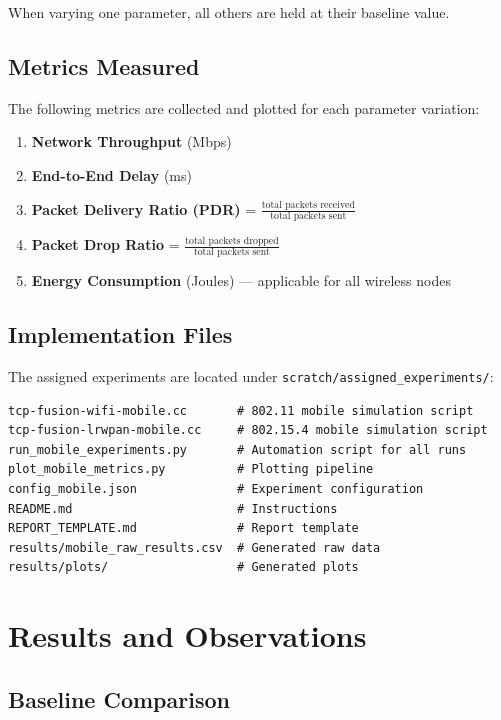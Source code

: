 \documentclass[12pt,a4paper]{article}
\begin{document}
When varying one parameter, all others are held at their baseline value.

\subsection{Metrics Measured}

The following metrics are collected and plotted for each parameter variation:

\begin{enumerate}
    \item \textbf{Network Throughput} (Mbps)
    \item \textbf{End-to-End Delay} (ms)
    \item \textbf{Packet Delivery Ratio (PDR)} = $\frac{\text{total packets received}}{\text{total packets sent}}$
    \item \textbf{Packet Drop Ratio} = $\frac{\text{total packets dropped}}{\text{total packets sent}}$
    \item \textbf{Energy Consumption} (Joules) --- applicable for all wireless nodes
\end{enumerate}

\subsection{Implementation Files}

The assigned experiments are located under \texttt{scratch/assigned\_experiments/}:

\begin{lstlisting}
tcp-fusion-wifi-mobile.cc       # 802.11 mobile simulation script
tcp-fusion-lrwpan-mobile.cc     # 802.15.4 mobile simulation script
run_mobile_experiments.py       # Automation script for all runs
plot_mobile_metrics.py          # Plotting pipeline
config_mobile.json              # Experiment configuration
README.md                       # Instructions
REPORT_TEMPLATE.md              # Report template
results/mobile_raw_results.csv  # Generated raw data
results/plots/                  # Generated plots
\end{lstlisting}

\section{Results and Observations}

\subsection{Baseline Comparison}
\end{document}
